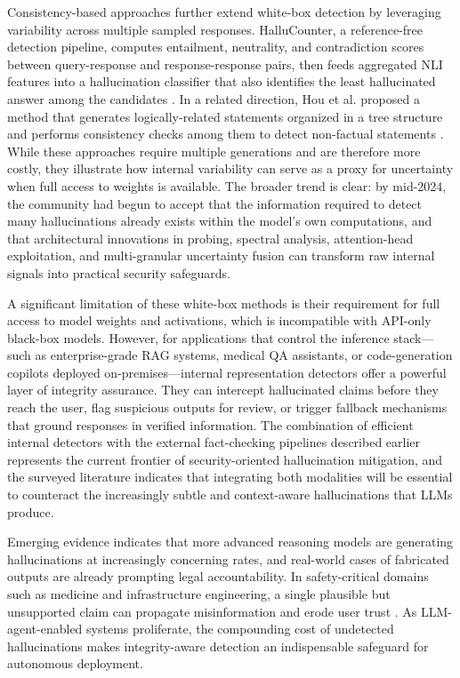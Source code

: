 \documentclass[11pt,a4paper]{article}
\begin{document}
Consistency-based approaches further extend white-box detection by leveraging variability across multiple sampled responses. HalluCounter, a reference-free detection pipeline, computes entailment, neutrality, and contradiction scores between query-response and response-response pairs, then feeds aggregated NLI features into a hallucination classifier that also identifies the least hallucinated answer among the candidates \cite{Urlana_2025_LLM_d7c09bcb}. In a related direction, Hou et al. proposed a method that generates logically-related statements organized in a tree structure and performs consistency checks among them to detect non-factual statements \cite{Hou_2024_LLM_1df5a9a5}. While these approaches require multiple generations and are therefore more costly, they illustrate how internal variability can serve as a proxy for uncertainty when full access to weights is available. The broader trend is clear: by mid-2024, the community had begun to accept that the information required to detect many hallucinations already exists within the model's own computations, and that architectural innovations in probing, spectral analysis, attention-head exploitation, and multi-granular uncertainty fusion can transform raw internal signals into practical security safeguards.

A significant limitation of these white-box methods is their requirement for full access to model weights and activations, which is incompatible with API-only black-box models. However, for applications that control the inference stack---such as enterprise-grade RAG systems, medical QA assistants, or code-generation copilots deployed on-premises---internal representation detectors offer a powerful layer of integrity assurance. They can intercept hallucinated claims before they reach the user, flag suspicious outputs for review, or trigger fallback mechanisms that ground responses in verified information. The combination of efficient internal detectors with the external fact-checking pipelines described earlier represents the current frontier of security-oriented hallucination mitigation, and the surveyed literature indicates that integrating both modalities will be essential to counteract the increasingly subtle and context-aware hallucinations that LLMs produce.

Emerging evidence indicates that more advanced reasoning models are generating hallucinations at increasingly concerning rates, and real-world cases of fabricated outputs are already prompting legal accountability. In safety-critical domains such as medicine and infrastructure engineering, a single plausible but unsupported claim can propagate misinformation and erode user trust \cite{Moslonka_2025_LLMs_76b3b56e}. As LLM-agent-enabled systems proliferate, the compounding cost of undetected hallucinations makes integrity-aware detection an indispensable safeguard for autonomous deployment.
\end{document}
